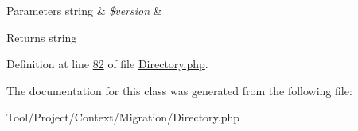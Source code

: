 \begin{DoxyParams}[1]{Parameters}
string & {\em \$version} & \\
\hline
\end{DoxyParams}
\begin{DoxyReturn}{Returns}
string 
\end{DoxyReturn}


Definition at line \hyperlink{Migration_2Directory_8php_source_l00082}{82} of file \hyperlink{Migration_2Directory_8php_source}{Directory.\-php}.



The documentation for this class was generated from the following file\-:\begin{DoxyCompactItemize}
\item 
Tool/\-Project/\-Context/\-Migration/Directory.\-php\end{DoxyCompactItemize}
